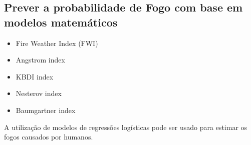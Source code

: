 \documentclass{article}
\begin{document}
\subsection{Prever a probabilidade de Fogo com base em modelos matemáticos}
\begin{itemize}
    \item Fire Weather Index (FWI)
    \item Angstrom index
    \item KBDI index
    \item Nesterov index
    \item Baumgartner index
\end{itemize}
A utilização de modelos de regressões logísticas pode ser usado para estimar os fogos causados por humanos.




\end{document}
